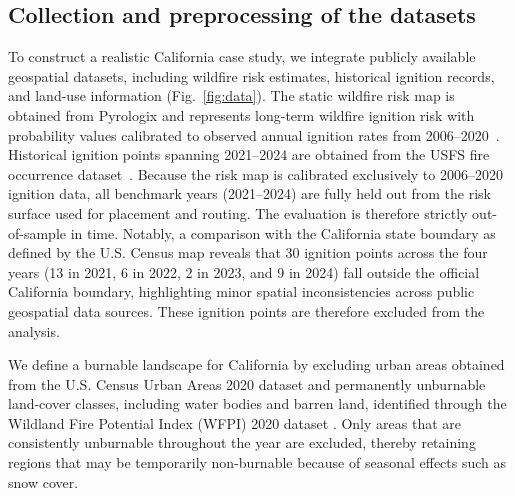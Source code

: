\documentclass[pdflatex,sn-mathphys-num]{sn-jnl}%
\theoremstyle{thmstyleone}%
\theoremstyle{thmstyletwo}%
\theoremstyle{thmstylethree}%
\begin{document}
\subsection*{Collection and preprocessing of the datasets}

To construct a realistic California case study, we integrate publicly available geospatial datasets, including wildfire risk estimates, historical ignition records, and land-use information (Fig.~\ref{fig:data}). The static wildfire risk map is obtained from Pyrologix and represents long-term wildfire ignition risk with probability values calibrated to observed annual ignition rates from 2006–2020~\cite{pyrologix}. Historical ignition points spanning 2021--2024 are obtained from the USFS fire occurrence dataset~\cite{usfs_ignition_points}. Because the risk map is calibrated exclusively to 2006--2020 ignition data, all benchmark years (2021--2024) are fully held out from the risk surface used for placement and routing. The evaluation is therefore strictly out-of-sample in time. Notably, a comparison with the California state boundary as defined by the U.S. Census map reveals that 30 ignition points across the four years (13 in 2021, 6 in 2022, 2 in 2023, and 9 in 2024) fall outside the official California boundary, highlighting minor spatial inconsistencies across public geospatial data sources. These ignition points are therefore excluded from the analysis.

We define a burnable landscape for California by excluding urban areas obtained from the U.S. Census Urban Areas 2020 dataset \cite{USCensusUrban2020} and permanently unburnable land-cover classes, including water bodies and barren land, identified through the Wildland Fire Potential Index (WFPI) 2020 dataset \cite{WFPI2020}. Only areas that are consistently unburnable throughout the year are excluded, thereby retaining regions that may be temporarily non-burnable because of seasonal effects such as snow cover.
\end{document}

